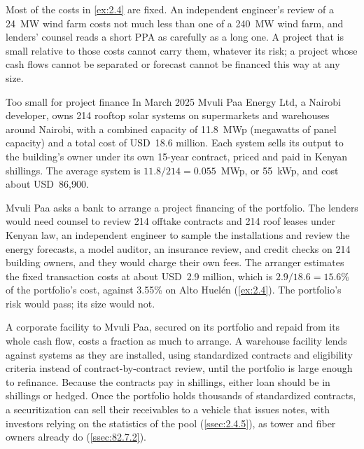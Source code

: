 Most of the costs in \cref{ex:2.4} are fixed. An independent engineer's review of a 24~MW wind farm costs not much less than one of a 240~MW wind farm, and lenders' counsel reads a short PPA as carefully as a long one. A project that is small relative to those costs cannot carry them, whatever its risk; a project whose cash flows cannot be separated or forecast cannot be financed this way at any size.

\begin{example}{Too small for project finance \illustrative}\label{ex:2.5}
In March 2025 Mvuli Paa Energy Ltd, a Nairobi developer, owns 214 rooftop solar systems on supermarkets and warehouses around Nairobi, with a combined capacity of 11.8~MWp (megawatts of panel capacity) and a total cost of USD~18.6 million. Each system sells its output to the building's owner under its own 15-year contract, priced and paid in Kenyan shillings. The average system is $11.8 / 214 = 0.055$~MWp, or 55~kWp, and cost about USD~86,900.

Mvuli Paa asks a bank to arrange a project financing of the portfolio. The lenders would need counsel to review 214 offtake contracts and 214 roof leases under Kenyan law, an independent engineer to sample the installations and review the energy forecasts, a model auditor, an insurance review, and credit checks on 214 building owners, and they would charge their own fees. The arranger estimates the fixed transaction costs at about USD~2.9 million, which is $2.9 / 18.6 = 15.6\%$ of the portfolio's cost, against 3.55\% on Alto Huelén (\cref{ex:2.4}). The portfolio's risk would pass; its size would not.

A corporate facility to Mvuli Paa, secured on its portfolio and repaid from its whole cash flow, costs a fraction as much to arrange. A warehouse facility lends against systems as they are installed, using standardized contracts and eligibility criteria instead of contract-by-contract review, until the portfolio is large enough to refinance. Because the contracts pay in shillings, either loan should be in shillings or hedged. Once the portfolio holds thousands of standardized contracts, a securitization can sell their receivables to a vehicle that issues notes, with investors relying on the statistics of the pool (\cref{ssec:2.4.5}), as tower and fiber owners already do (\cref{ssec:82.7.2}).
\end{example}


